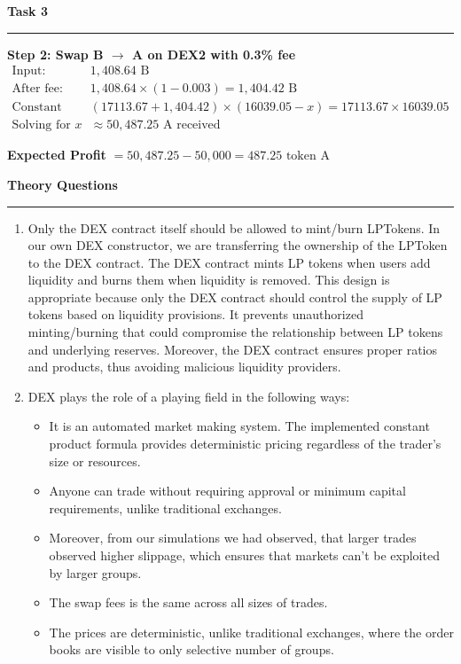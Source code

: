\documentclass[a4paper]{article}
\newenvironment{solution}[2][]{%
\begin{mdframed}[linecolor=blue!70!black, linewidth=2pt, roundcorner=10pt, backgroundcolor=yellow!10!white, skipabove=12pt, skipbelow=12pt]%
	\textbf{\large #2}
	\par\noindent\rule{\textwidth}{0.4pt}
}{
\end{mdframed}
}
\begin{document}
\begin{solution}{Task 3}
	\textbf{Step 2: Swap B $\rightarrow$ A on DEX2 with 0.3\% fee}
	\begin{align*}
	\text{Input: } &1,408.64 \text{ B}\\
	\text{After fee: } &1,408.64 \times (1 - 0.003) = 1,404.42 \text{ B}\\
	\text{Constant product: } &(17113.67 + 1,404.42) \times (16039.05 - x) = 17113.67 \times 16039.05\\
	\text{Solving for } x &\approx 50,487.25 \text{ A received}
	\end{align*}
	
	\textbf{Expected Profit} $= 50,487.25 - 50,000 = 487.25 \text{ token A}$	
\end{solution}

\clearpage
\begin{solution}{Theory Questions}
	\begin{enumerate}
		\item Only the DEX contract itself should be allowed to mint/burn LPTokens. In our own DEX constructor, we are transferring the ownership of the LPToken to the DEX contract. The DEX contract mints LP tokens when users add liquidity and burns them when liquidity is removed. This design is appropriate because only the DEX contract should control the supply of LP tokens based on liquidity provisions. It prevents unauthorized minting/burning that could compromise the relationship between LP tokens and underlying reserves. Moreover, the DEX contract ensures proper ratios and products, thus avoiding malicious liquidity providers.
	
	\item DEX plays the role of a playing field in the following ways:
	\begin{itemize}
		\item It is an automated market making system. The implemented constant product formula provides deterministic pricing regardless of the trader's size or resources.
		\item Anyone can trade without requiring approval or minimum capital requirements, unlike traditional exchanges.
		\item Moreover, from our simulations we had observed, that larger trades observed higher slippage, which ensures that markets can't be exploited by larger groups.
		\item The swap fees is the same across all sizes of trades.
		\item The prices are deterministic, unlike traditional exchanges, where the order books are visible to only selective number of groups.
	\end{itemize}


\end{enumerate}
\end{solution}
\end{document}
